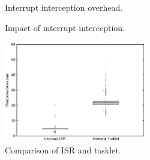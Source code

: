 \begin{figure}[!t]
\begin{minipage}[t]{0.33\hsize}
\begin{center}
\end{center}
\caption{\small{Interrupt interception overhead. \newline \,}}
\label{fig:irq_overhead}
\end{minipage}
\begin{minipage}[t]{0.33\hsize}
\begin{center}
\end{center}
\caption{\small{Impact of interrupt interception.}}
\label{fig:response}
\end{minipage}
\begin{minipage}[t]{0.33\hsize}
\begin{center}
\includegraphics[width=62mm]{img/tasklet_vs_interrupt}
\end{center}
\caption{\small{Comparison of ISR and tasklet.}}
\label{fig:bottomvstasklet}
\end{minipage}
\end{figure}

